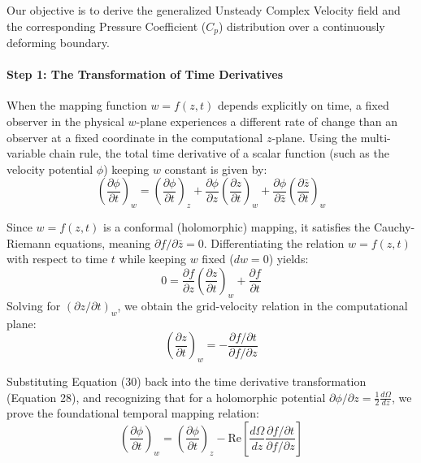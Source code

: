 \documentclass[12pt,a4paper]{article}
\begin{document}
Our objective is to derive the generalized Unsteady Complex Velocity field and the corresponding Pressure Coefficient ($C_p$) distribution over a continuously deforming boundary.

\paragraph{Step 1: The Transformation of Time Derivatives}
When the mapping function $w = f(z,t)$ depends explicitly on time, a fixed observer in the physical $w$-plane experiences a different rate of change than an observer at a fixed coordinate in the computational $z$-plane. Using the multi-variable chain rule, the total time derivative of a scalar function (such as the velocity potential $\phi$) keeping $w$ constant is given by:
\begin{equation}
    \left( \frac{\partial \phi}{\partial t} \right)_w = \left( \frac{\partial \phi}{\partial t} \right)_z + \frac{\partial \phi}{\partial z} \left( \frac{\partial z}{\partial t} \right)_w + \frac{\partial \phi}{\partial \bar{z}} \left( \frac{\partial \bar{z}}{\partial t} \right)_w
\end{equation}

Since $w = f(z,t)$ is a conformal (holomorphic) mapping, it satisfies the Cauchy-Riemann equations, meaning $\partial f / \partial \bar{z} = 0$. Differentiating the relation $w = f(z,t)$ with respect to time $t$ while keeping $w$ fixed ($dw = 0$) yields:
\begin{equation}
    0 = \frac{\partial f}{\partial z} \left( \frac{\partial z}{\partial t} \right)_w + \frac{\partial f}{\partial t}
\end{equation}
Solving for $(\partial z/\partial t)_w$, we obtain the grid-velocity relation in the computational plane:
\begin{equation}
    \left( \frac{\partial z}{\partial t} \right)_w = - \frac{\partial f / \partial t}{\partial f / \partial z}
\end{equation}

Substituting Equation (30) back into the time derivative transformation (Equation 28), and recognizing that for a holomorphic potential $\partial \phi/\partial z = \frac{1}{2}\frac{d\Omega}{dz}$, we prove the foundational temporal mapping relation:
\begin{equation}
    \boxed{\left( \frac{\partial \phi}{\partial t} \right)_w = \left( \frac{\partial \phi}{\partial t} \right)_z - \text{Re} \left[ \frac{d\Omega}{dz} \frac{\partial f / \partial t}{\partial f / \partial z} \right]}
\end{equation}
\end{document}
